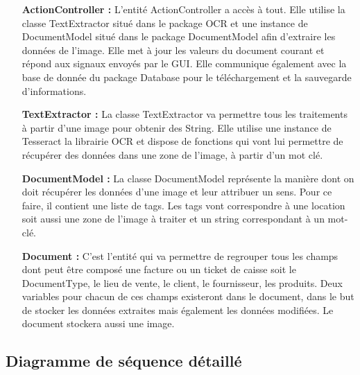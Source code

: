 \begin{itemize}
	\item[{\bf ActionController :}] L'entité ActionController a accès à tout. Elle utilise la classe TextExtractor situé dans le package OCR et une instance de DocumentModel situé dans le package DocumentModel afin d'extraire les données de l'image. Elle met à jour les valeurs du document courant et répond aux signaux envoyés par le GUI. Elle communique également avec la base de donnée du package Database pour le téléchargement et la sauvegarde d'informations.\\
	
	\item[{\bf TextExtractor :}] La classe TextExtractor va permettre tous les traitements à partir d'une image pour obtenir des String. Elle utilise une instance de Tesseract la librairie OCR et dispose de fonctions qui vont lui permettre de récupérer des données dans une zone de l'image, à partir d'un mot clé.\\
	
	\item[{\bf DocumentModel :}] La classe DocumentModel représente la manière dont on doit récupérer les données d'une image et leur attribuer un sens. Pour ce faire, il contient une liste de tags. Les tags vont correspondre à une location soit aussi une zone de l'image à traiter et un string correspondant à un mot-clé.\\
	
	\item[{\bf Document :}] C'est l'entité qui va permettre de regrouper tous les champs dont peut être composé une facture ou un ticket de caisse soit le DocumentType, le lieu de vente, le client, le fournisseur, les produits. Deux variables pour chacun de ces champs existeront dans le document, dans le but de stocker les données extraites mais également les données modifiées. Le document stockera aussi une image.
 \end{itemize}
 
 

\subsection{Diagramme de séquence détaillé}

\newpage

